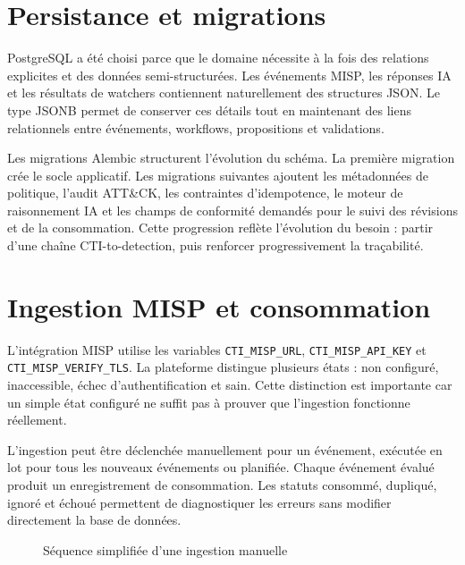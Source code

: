 \section{Persistance et migrations}

PostgreSQL a été choisi parce que le domaine nécessite à la fois des relations explicites et des données semi-structurées. Les événements MISP, les réponses IA et les résultats de watchers contiennent naturellement des structures JSON. Le type JSONB permet de conserver ces détails tout en maintenant des liens relationnels entre événements, workflows, propositions et validations.

Les migrations Alembic structurent l'évolution du schéma. La première migration crée le socle applicatif. Les migrations suivantes ajoutent les métadonnées de politique, l'audit ATT\&CK, les contraintes d'idempotence, le moteur de raisonnement IA et les champs de conformité demandés pour le suivi des révisions et de la consommation. Cette progression reflète l'évolution du besoin : partir d'une chaîne CTI-to-detection, puis renforcer progressivement la traçabilité.

\section{Ingestion MISP et consommation}

L'intégration MISP utilise les variables \texttt{CTI\_MISP\_URL}, \texttt{CTI\_MISP\_API\_KEY} et \texttt{CTI\_MISP\_VERIFY\_TLS}. La plateforme distingue plusieurs états : non configuré, inaccessible, échec d'authentification et sain. Cette distinction est importante car un simple état \og configuré \fg{} ne suffit pas à prouver que l'ingestion fonctionne réellement.

L'ingestion peut être déclenchée manuellement pour un événement, exécutée en lot pour tous les nouveaux événements ou planifiée. Chaque événement évalué produit un enregistrement de consommation. Les statuts consommé, dupliqué, ignoré et échoué permettent de diagnostiquer les erreurs sans modifier directement la base de données.

\begin{figure}[H]
\centering
{}
\caption{Séquence simplifiée d'une ingestion manuelle}
\label{fig:sequence-ingestion}
\end{figure}


